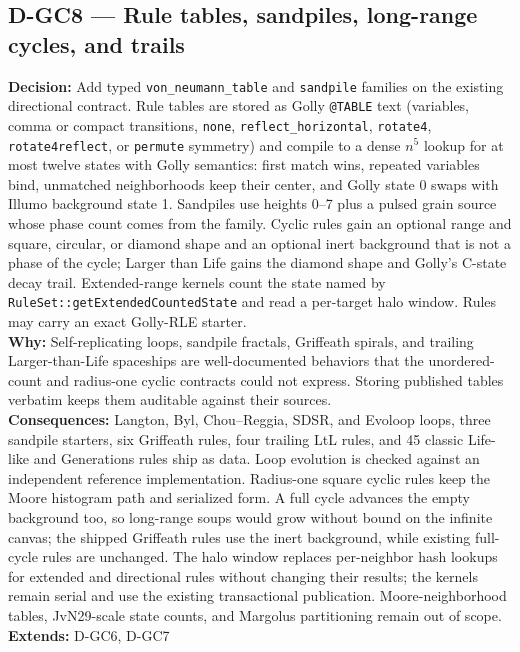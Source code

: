 \subsection*{D-GC8 --- Rule tables, sandpiles, long-range cycles, and trails}
\begin{decisionbox}[title={D-GC8 \quad 2026-09-23}]
\textbf{Decision:} Add typed \texttt{von\_neumann\_table} and
\texttt{sandpile} families on the existing directional contract. Rule tables
are stored as Golly \texttt{@TABLE} text (variables, comma or compact
transitions, \texttt{none}, \texttt{reflect\_horizontal},
\texttt{rotate4}, \texttt{rotate4reflect}, or \texttt{permute} symmetry) and
compile to a dense $n^5$ lookup for at most twelve states with Golly
semantics: first match wins, repeated variables bind, unmatched neighborhoods
keep their center, and Golly state 0 swaps with Illumo background state 1.
Sandpiles use heights 0--7 plus a pulsed grain source whose phase count comes
from the family. Cyclic rules gain an optional range and square, circular, or
diamond shape and an optional inert background that is not a phase of the
cycle; Larger than Life gains the diamond shape and Golly's C-state
decay trail. Extended-range kernels count the state named by
\texttt{RuleSet::getExtendedCountedState} and read a per-target halo window.
Rules may carry an exact Golly-RLE starter.\\
\textbf{Why:} Self-replicating loops, sandpile fractals, Griffeath spirals, and
trailing Larger-than-Life spaceships are well-documented behaviors that the
unordered-count and radius-one cyclic contracts could not express. Storing
published tables verbatim keeps them auditable against their sources.\\
\textbf{Consequences:} Langton, Byl, Chou--Reggia, SDSR, and Evoloop loops,
three sandpile starters, six Griffeath rules, four trailing LtL rules, and 45
classic Life-like and Generations rules ship as data. Loop evolution is checked
against an independent reference implementation. Radius-one square cyclic rules
keep the Moore histogram path and serialized form. A full cycle advances the
empty background too, so long-range soups would grow without bound on the
infinite canvas; the shipped Griffeath rules use the inert background, while
existing full-cycle rules are unchanged. The halo window replaces
per-neighbor hash lookups for extended and directional rules without changing
their results; the kernels remain serial and use the existing transactional
publication. Moore-neighborhood tables, JvN29-scale state counts, and
Margolus partitioning remain out of scope.\\
\textbf{Extends:} D-GC6, D-GC7
\end{decisionbox}

